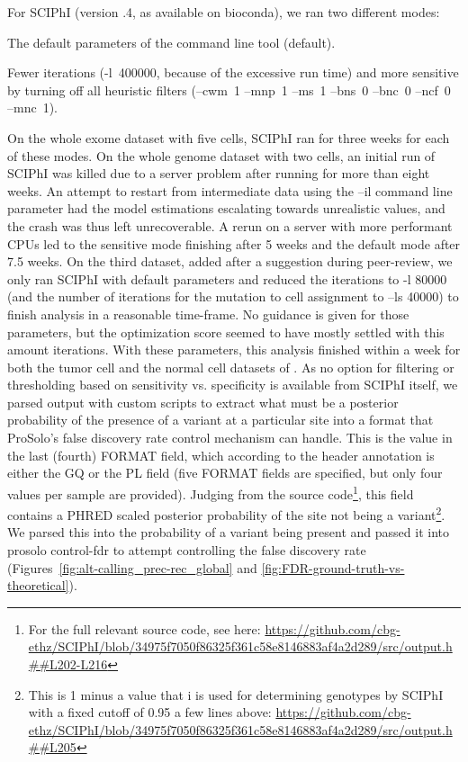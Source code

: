 \documentclass[authoryear,preprint,11pt]{scrartcl}
\begin{document}
For SCIPhI (version {.4}, as available on bioconda), we ran two different modes:
\begin{enumerate*}
 \item The default parameters of the command line tool ({\ttfamily default}).
 \item Fewer iterations ({\ttfamily -l~400000}, because of the excessive run time) and more {\ttfamily sensitive} by turning off all heuristic filters ({\ttfamily --cwm~1 --mnp~1 --ms~1 --bns~0 --bnc~0 --ncf~0 --mnc~1}).
\end{enumerate*}
On the whole exome dataset with five cells, SCIPhI ran for three weeks for each of these modes.
On the whole genome dataset with two cells, an initial run of SCIPhI was killed due to a server problem after running for more than eight weeks.
An attempt to restart from intermediate data using the {\ttfamily --il} command line parameter had the model estimations escalating towards unrealistic values, and the crash was thus left unrecoverable.
A rerun on a server with more performant CPUs led to the sensitive mode finishing after 5 weeks and the default mode after 7.5 weeks.
On the third dataset, added after a suggestion during peer-review, we only ran SCIPhI with default parameters and reduced the iterations to {\ttfamily -l 80000} (and the number of iterations for the mutation to cell assignment to {\ttfamily --ls 40000}) to finish analysis in a reasonable time-frame.
No guidance is given for those parameters, but the optimization score seemed to have mostly settled with this amount iterations.
With these parameters, this analysis finished within a week for both the tumor cell and the normal cell datasets of \cite{wang_clonal_2014}.
As no option for filtering or thresholding based on sensitivity vs. specificity is available from SCIPhI itself, we parsed output with custom scripts to extract what must be a posterior probability of the presence of a variant at a particular site into a format that ProSolo's false discovery rate control mechanism can handle.
This is the value in the last (fourth) FORMAT field, which according to the header annotation is either the GQ or the PL field (five FORMAT fields are specified, but only four values per sample are provided).
Judging from the source code\footnote{For the full relevant source code, see here: \url{https://github.com/cbg-ethz/SCIPhI/blob/34975f7050f86325f361c58e8146883af4a2d289/src/output.h##L202-L216}}, this field contains a PHRED scaled posterior probability of the site not being a variant\footnote{This is 1 minus a value that i is used for determining genotypes by SCIPhI with a fixed cutoff of 0.95 a few lines above: \url{https://github.com/cbg-ethz/SCIPhI/blob/34975f7050f86325f361c58e8146883af4a2d289/src/output.h##L205}}.
We parsed this into the probability of a variant being present and passed it into {\ttfamily prosolo control-fdr} to attempt controlling the false discovery rate (Figures~\ref{fig:alt-calling_prec-rec_global} and \ref{fig:FDR-ground-truth-vs-theoretical}).
\end{document}
